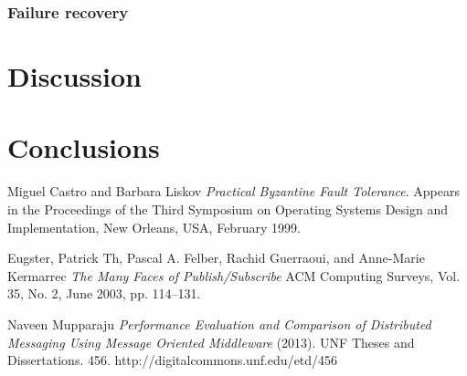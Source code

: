 \documentclass[conference]{IEEEtran}
\begin{document}
\subsubsection{Failure recovery}
\section{Discussion}

\section{Conclusions}

{}

\begin{thebibliography}{9}
Miguel Castro and Barbara Liskov
\textit{Practical Byzantine Fault Tolerance}. 
Appears in the Proceedings of the Third Symposium on Operating Systems Design and Implementation, New Orleans, USA, February 1999.

Eugster, Patrick Th, Pascal A. Felber, Rachid Guerraoui, and Anne-Marie Kermarrec
\textit{The Many Faces of Publish/Subscribe}
ACM Computing Surveys, Vol. 35, No. 2, June 2003, pp. 114–131.
 
Naveen Mupparaju
\textit{Performance Evaluation and Comparison of Distributed Messaging Using Message Oriented Middleware}
(2013). UNF Theses and Dissertations. 456.
http://digitalcommons.unf.edu/etd/456
 
\end{thebibliography}
\end{document}
